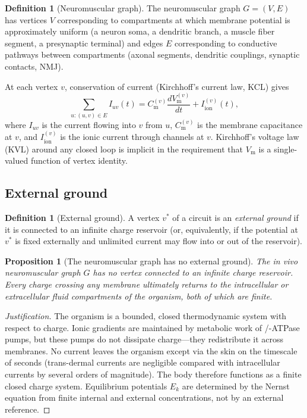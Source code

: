 \documentclass[11pt,twocolumn,a4paper]{article}
\newtheorem{proposition}[theorem]{Proposition}
\theoremstyle{definition}
\newtheorem{definition}[theorem]{Definition}
\theoremstyle{remark}
\newcommand{\Vm}{V_{\mathrm{m}}}
\newcommand{\Iion}{I_{\mathrm{ion}}}
\newcommand{\Cm}{C_{\mathrm{m}}}
\begin{document}
\begin{definition}[Neuromuscular graph]
\label{def:nm-graph}
The neuromuscular graph $G = (V, E)$ has vertices $V$ corresponding to
compartments at which membrane potential is approximately uniform
(a neuron soma, a dendritic branch, a muscle fiber segment, a
presynaptic terminal) and edges $E$ corresponding to conductive
pathways between compartments (axonal segments, dendritic couplings,
synaptic contacts, NMJ).
\end{definition}

At each vertex $v$, conservation of current (Kirchhoff's current law,
KCL) gives
\begin{equation}
\sum_{u : (u,v) \in E} I_{uv}(t) = \Cm^{(v)} \frac{d \Vm^{(v)}}{dt}
+ \Iion^{(v)}(t),
\label{eq:kcl}
\end{equation}
where $I_{uv}$ is the current flowing into $v$ from $u$,
$\Cm^{(v)}$ is the membrane capacitance at $v$, and $\Iion^{(v)}$ is
the ionic current through channels at $v$. Kirchhoff's voltage law
(KVL) around any closed loop is implicit in the requirement that
$\Vm$ is a single-valued function of vertex identity.

\subsection{External ground}

\begin{definition}[External ground]
A vertex $v^*$ of a circuit is an \emph{external ground} if it is
connected to an infinite charge reservoir (or, equivalently, if the
potential at $v^*$ is fixed externally and unlimited current may flow
into or out of the reservoir).
\end{definition}

\begin{proposition}[The neuromuscular graph has no external ground]
\label{prop:no-ground}
The in vivo neuromuscular graph $G$ has no vertex connected to an
infinite charge reservoir. Every charge crossing any membrane
ultimately returns to the intracellular or extracellular fluid
compartments of the organism, both of which are finite.
\end{proposition}

\begin{proof}[Justification]
The organism is a bounded, closed thermodynamic system with respect
to charge. Ionic gradients are maintained by metabolic work of
/-ATPase pumps, but these pumps do not dissipate
charge---they redistribute it across membranes. No current leaves the
organism except via the skin on the timescale of seconds (trans-dermal
currents are negligible compared with intracellular currents by
several orders of magnitude). The body therefore functions as a finite
closed charge system. Equilibrium potentials $E_k$ are determined by
the Nernst equation from finite internal and external concentrations,
not by an external reference.
\end{proof}
\end{document}
